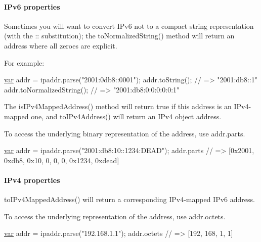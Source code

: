 \paragraph*{I\+Pv6 properties}

Sometimes you will want to convert I\+Pv6 not to a compact string representation (with the {\ttfamily \+:\+:} substitution); the {\ttfamily to\+Normalized\+String()} method will return an address where all zeroes are explicit.

For example\+:


\begin{DoxyCode}
\hyperlink{018__def_8c_a335628f2e9085305224b4f9cc6e95ed5}{var} addr = ipaddr.parse(\textcolor{stringliteral}{"2001:0db8::0001"});
addr.toString(); \textcolor{comment}{// => "2001:db8::1"}
addr.toNormalizedString(); \textcolor{comment}{// => "2001:db8:0:0:0:0:0:1"}
\end{DoxyCode}


The {\ttfamily is\+I\+Pv4\+Mapped\+Address()} method will return {\ttfamily true} if this address is an I\+Pv4-\/mapped one, and {\ttfamily to\+I\+Pv4\+Address()} will return an I\+Pv4 object address.

To access the underlying binary representation of the address, use {\ttfamily addr.\+parts}.


\begin{DoxyCode}
\hyperlink{018__def_8c_a335628f2e9085305224b4f9cc6e95ed5}{var} addr = ipaddr.parse(\textcolor{stringliteral}{"2001:db8:10::1234:DEAD"});
addr.parts \textcolor{comment}{// => [0x2001, 0xdb8, 0x10, 0, 0, 0, 0x1234, 0xdead]}
\end{DoxyCode}


\paragraph*{I\+Pv4 properties}

{\ttfamily to\+I\+Pv4\+Mapped\+Address()} will return a corresponding I\+Pv4-\/mapped I\+Pv6 address.

To access the underlying representation of the address, use {\ttfamily addr.\+octets}.


\begin{DoxyCode}
\hyperlink{018__def_8c_a335628f2e9085305224b4f9cc6e95ed5}{var} addr = ipaddr.parse(\textcolor{stringliteral}{"192.168.1.1"});
addr.octets \textcolor{comment}{// => [192, 168, 1, 1]}
\end{DoxyCode}
 